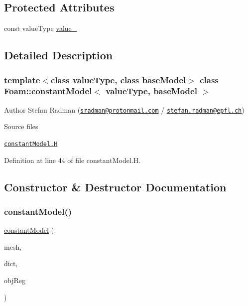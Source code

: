 \subsection*{Protected Attributes}
\begin{DoxyCompactItemize}
\item 
const value\+Type \hyperlink{classFoam_1_1constantModel_a1ae43fe11396615bd36830d95174d2ad}{value\+\_\+}
\end{DoxyCompactItemize}


\subsection{Detailed Description}
\subsubsection*{template$<$class value\+Type, class base\+Model$>$\newline
class Foam\+::constant\+Model$<$ value\+Type, base\+Model $>$}

Author Stefan Radman (\href{mailto:sradman@protonmail.com}{\tt sradman@protonmail.\+com} / \href{mailto:stefan.radman@epfl.ch}{\tt stefan.\+radman@epfl.\+ch}) 

\label{_Description}%
 \begin{DoxyParagraph}{Source files}

\begin{DoxyItemize}
\item \href{../../../home/carlo/data/GeN-Foam/GeN-Foam_ffn/GeN-Foam/GeN-Foam/classes/thermalHydraulics/src/physicsModels/templatedModels/constant/constantModel.H}{\tt constant\+Model.\+H} 
\end{DoxyItemize}
\end{DoxyParagraph}


Definition at line 44 of file constant\+Model.\+H.



\subsection{Constructor \& Destructor Documentation}
\mbox{\label{classFoam_1_1constantModel_a57a5acf77888729f405853f79c9eb7be}} 
\subsubsection{\texorpdfstring{constant\+Model()}{constantModel()}\hspace{0.1cm}{\footnotesize\ttfamily [1/2]}}
{\footnotesize\ttfamily \hyperlink{classFoam_1_1constantModel}{constant\+Model} (\begin{DoxyParamCaption}\item[{const fv\+Mesh \&}]{mesh,  }\item[{const dictionary \&}]{dict,  }\item[{const object\+Registry \&}]{obj\+Reg }\end{DoxyParamCaption})}

